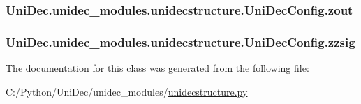 \subsubsection[{zout}]{\setlength{\rightskip}{0pt plus 5cm}Uni\+Dec.\+unidec\+\_\+modules.\+unidecstructure.\+Uni\+Dec\+Config.\+zout}\label{class_uni_dec_1_1unidec__modules_1_1unidecstructure_1_1_uni_dec_config_a17531709b9d1897809460acd19e004ab}
\hypertarget{class_uni_dec_1_1unidec__modules_1_1unidecstructure_1_1_uni_dec_config_ae5221759fdaf03b2c2be67ec1e91edc8}{}
\subsubsection[{zzsig}]{\setlength{\rightskip}{0pt plus 5cm}Uni\+Dec.\+unidec\+\_\+modules.\+unidecstructure.\+Uni\+Dec\+Config.\+zzsig}\label{class_uni_dec_1_1unidec__modules_1_1unidecstructure_1_1_uni_dec_config_ae5221759fdaf03b2c2be67ec1e91edc8}


The documentation for this class was generated from the following file\+:\begin{DoxyCompactItemize}
\item 
C\+:/\+Python/\+Uni\+Dec/unidec\+\_\+modules/\hyperlink{unidecstructure_8py}{unidecstructure.\+py}\end{DoxyCompactItemize}
